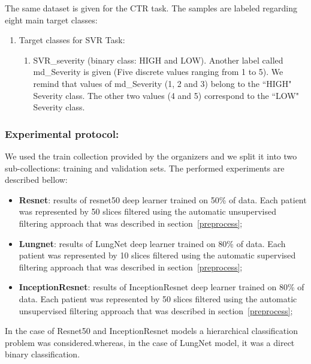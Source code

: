The same dataset is given for the CTR task. The samples are labeled regarding eight main target classes: 
\begin{enumerate}
\item Target classes for SVR Task:
\begin{enumerate}
\item SVR\_severity (binary class: HIGH and LOW). Another label called md\_Severity is given (Five discrete values ranging from 1 to 5). We remind that values of md\_Severity (1, 2 and 3) belong to the ``HIGH" Severity class. The other two values (4 and 5) correspond to the ``LOW" Severity class.
\end{enumerate}
\end{enumerate}
\subsubsection{Experimental protocol:}

We used the train collection provided by the organizers and we split it into two sub-collections: training and validation sets. The performed experiments are described bellow:
\begin{itemize}

\item \textbf{Resnet}: results of resnet50 deep learner trained on 50\% of data. Each patient was represented by 50 slices filtered using the automatic unsupervised filtering approach that was described in section~\ref{preprocess};

\item \textbf{Lungnet}: results of LungNet deep learner trained on 80\% of data. Each patient was represented by 10 slices filtered using the automatic supervised filtering approach that was described in section~\ref{preprocess};

\item \textbf{InceptionResnet}: results of InceptionResnet deep learner trained on 80\% of data. Each patient was represented by 50 slices filtered using the automatic unsupervised filtering approach that was described in section~\ref{preprocess};
\end{itemize}

In the case of Resnet50 and InceptionResnet models a hierarchical classification problem was considered.whereas, in the case of LungNet model, it was a direct binary classification.

